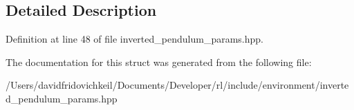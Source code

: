 \subsection{Detailed Description}


Definition at line 48 of file inverted\+\_\+pendulum\+\_\+params.\+hpp.



The documentation for this struct was generated from the following file\+:\begin{DoxyCompactItemize}
\item 
/\+Users/davidfridovichkeil/\+Documents/\+Developer/rl/include/environment/inverted\+\_\+pendulum\+\_\+params.\+hpp\end{DoxyCompactItemize}
